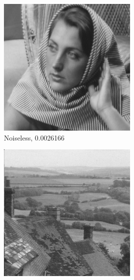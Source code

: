 \documentclass[a4paper]{article}
\begin{document}
\begin{figure}[H]
\begin{subfigure}{0.24\linewidth}
        \includegraphics[width = \linewidth]{dct2D/barbara256 reconstructed using all measurements, without noise.png}
        \caption{Noiseless, 0.0026166}
    \end{subfigure}
    \begin{subfigure}{0.24\linewidth}
        \centering
        \includegraphics[width = \linewidth]{dct2D/goldhill reconstructed using all measurements, with noise.png}

\end{subfigure}
\end{figure}
\end{document}
